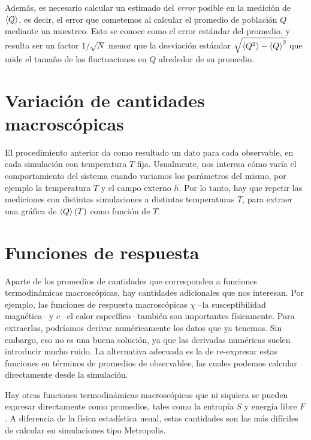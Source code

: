 Además, es necesario calcular un estimado del \emph{error} posible en la medición de $\left \langle Q \right \rangle$, es decir, el error que cometemos al calcular el promedio de población $Q$ mediante un muestreo. Esto se conoce como el error estándar del promedio, y resulta ser un factor $1/\sqrt{N}$ menor que la desviación estándar $\sqrt{\left \langle Q^2 \right \rangle - \left \langle Q \right \rangle^2}$ que mide el tamaño de las fluctuaciones en $Q$ alrededor de su promedio.

\section{Variación de cantidades macroscópicas}
El procedimiento anterior da como resultado un dato para cada observable, en cada simulación con temperatura $T$ fija. Usualmente, nos interesa cómo varía el comportamiento del sistema cuando variamos los parámetros del mismo, por ejemplo la temperatura $T$ y el campo externo $h$. Por lo tanto, hay que repetir las mediciones con distintas simulaciones a distintas temperaturas $T$, para extraer una gráfica de $\left \langle Q \right \rangle(T)$ como función de $T$.

\section{Funciones de respuesta}
Aparte de los promedios de cantidades que corresponden a funciones termodinámicas macroscópicas, hay cantidades adicionales que nos interesan. Por ejemplo, las funciones de respuesta macroscópicas $\chi$ --la susceptibilidad magnética-- y $c$ --el calor específico-- también son importantes físicamente. Para extraerlas, podríamos derivar numéricamente los datos que ya tenemos. Sin embargo, eso no es una buena solución, ya que las derivadas numéricas suelen introducir mucho ruido. La alternativa adecuada es la de re-expresar estas funciones en términos de promedios de observables, las cuales podemos calcular directamente desde la simulación.


Hay otras funciones termodinámicas macroscópicas que ni siquiera se pueden expresar directamente como promedios, tales como la entropía $S$ y energía libre $F$. A diferencia de la física estadística usual, estas cantidades son las más difíciles de calcular en simulaciones tipo Metropolis.
